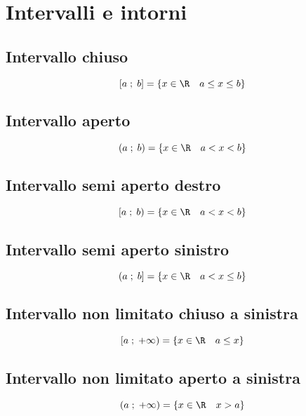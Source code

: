 \chapter{Intervalli e intorni}
\section{Intervallo chiuso}
\begin{equation*}
\left[a\; ;\; b\right]=\lbrace x\in\R\quad a\leq x\leq b\rbrace
\end{equation*}
\section{Intervallo aperto}
\begin{equation*}
\left(a\; ;\; b\right)=\lbrace x\in\R\quad a<x<b\rbrace
\end{equation*}
\section{Intervallo semi aperto destro}
\begin{equation*}
\left[a\; ;\; b\right)=\lbrace x\in\R\quad a<x<b\rbrace
\end{equation*}
\section{Intervallo semi aperto sinistro}
\begin{equation*}
\left(a\; ;\; b\right]=\lbrace x\in\R\quad a<x\leq b\rbrace
\end{equation*}
\section{Intervallo non limitato chiuso a sinistra}
\begin{equation*}
\left[a\; ;\; +\infty\right)=\lbrace x\in\R\quad a\leq x \rbrace
\end{equation*}
\section{Intervallo non limitato aperto a sinistra}
\begin{equation*}
\left(a\; ;\; +\infty\right)=\lbrace x\in\R\quad x> a\rbrace
\end{equation*}
